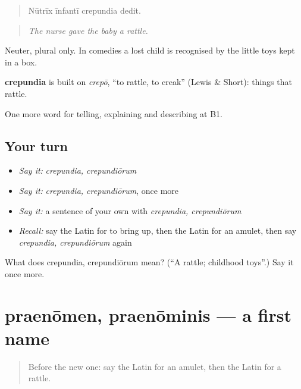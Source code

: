 \begin{quote}
Nūtrīx īnfantī crepundia dedit.
\end{quote}

\begin{quote}
\emph{The nurse gave the baby a rattle.}
\end{quote}

Neuter, plural only. In comedies a lost child is recognised by the little toys kept in a box.

\begin{cousinweb}
\textbf{crepundia} is built on \emph{crepō}, \textquotedblleft{}to rattle, to creak\textquotedblright{} (Lewis \& Short): things that rattle.
\end{cousinweb}

\begin{grammarlens}[title={What you've built}]
One more word for telling, explaining and describing at B1.
\end{grammarlens}

\subsection*{Your turn}
\begin{itemize}
\raggedright
  \item \emph{Say it:} \emph{crepundia, crepundiōrum}
  \item \emph{Say it:} \emph{crepundia, crepundiōrum}, once more
  \item \emph{Say it:} a sentence of your own with \emph{crepundia, crepundiōrum}
  \item \emph{Recall:} say the Latin for to bring up, then the Latin for an amulet, then say \emph{crepundia, crepundiōrum} again
\end{itemize}

\begin{tcolorbox}[breakable,colback=teal!4,colframe=teal!35!black,title={Before you move on}]
What does crepundia, crepundiōrum mean? (\textquotedblleft{}A rattle; childhood toys\textquotedblright{}.) Say it once more.
\end{tcolorbox}
\section[praenōmen, praenōminis]{praenōmen, praenōminis — a first name}

\label{lesson:LA-C325-praenomen}



\begin{quote}
Before the new one: say the Latin for an amulet, then the Latin for a rattle.
\end{quote}

